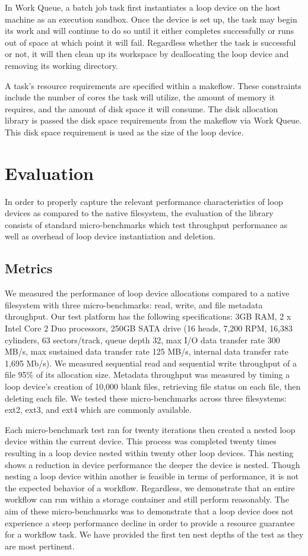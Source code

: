 \documentclass[conference]{IEEEtran}
\begin{document}
In Work Queue, a batch job task first instantiates a loop device on the host machine as an execution sandbox. Once the device is set up, the task may begin its work and will continue to do so until it either completes successfully or runs out of space at which point it will fail. Regardless whether the task is successful or not, it will then clean up its workspace by deallocating the loop device and removing its working directory.

A task's resource requirements are specified within a makeflow. These constraints include the number of cores the task will utilize, the amount of memory it requires, and the amount of disk space it will consume. The disk allocation library is passed the disk space requirements from the makeflow via Work Queue. This disk space requirement is used as the size of the loop device.

\section{Evaluation}
In order to properly capture the relevant performance characteristics of loop devices as compared to the native filesystem, the evaluation of the library consists of standard micro-benchmarks which test throughput performance as well as overhead of loop device instantiation and deletion.

\subsection{Metrics}
We measured the performance of loop device allocations compared to a native filesystem with three micro-benchmarks: read, write, and file metadata throughput. Our test platform has the following specifications: 3GB RAM, 2 x Intel Core 2 Duo processors, 250GB SATA drive (16 heads, 7,200 RPM, 16,383 cylinders, 63 sectors/track, queue depth 32, max I/O data transfer rate 300 MB/s, max sustained data transfer rate 125 MB/s, internal data transfer rate 1,695 Mb/s). We measured sequential read and sequential write throughput of a file 95\% of its allocation size. Metadata throughput was measured by timing a loop device's creation of 10,000 blank files, retrieving file status on each file, then deleting each file. We tested these micro-benchmarks across three filesystems: ext2, ext3, and ext4 which are commonly available. 

Each micro-benchmark test ran for twenty iterations then created a nested loop device within the current device. This process was completed twenty times resulting in a loop device nested within twenty other loop devices. This nesting shows a reduction in device performance the deeper the device is nested. Though nesting a loop device within another is feasible in terms of performance, it is not the expected behavior of a workflow. Regardless, we demonstrate that an entire workflow can run within a storage container and still perform reasonably. The aim of these micro-benchmarks was to demonstrate that a loop device does not experience a steep performance decline in order to provide a resource guarantee for a workflow task. We have provided the first ten nest depths of the test as they are most pertinent.
\end{document}
